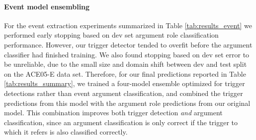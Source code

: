 \documentclass[11pt,a4paper]{article}
\begin{document}
\paragraph{Event model ensembling} For the event extraction experiments summarized in Table \ref{tab:results_event} we performed early stopping based on dev set argument role classification performance. However, our trigger detector tended to overfit before the argument classifier had finished training. We also found stopping based on dev set error to be unreliable, due to the small size and domain shift between dev and test split on the ACE05-E data set. Therefore, for our final predictions reported in Table \ref{tab:results_summary}, we trained a four-model ensemble optimized for trigger detections rather than event argument classification, and combined the trigger predictions from this model with the argument role predictions from our original model. This combination improves both trigger detection \emph{and} argument classification, since an argument classification is only correct if the trigger to which it refers is also classified correctly.
 
\end{document}
